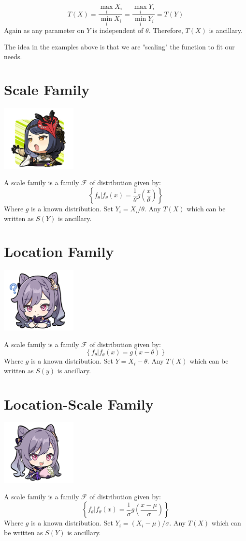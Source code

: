 \documentclass[oneside]{book}
\begin{document}
$$T(X)=\frac{\max_i X_i}{\min_i X_i}=\frac{\max_i Y_i}{\min_i Y_i}=T(Y)$$
Again as any parameter on $Y$ is independent of $\theta$. Therefore, $T(X)$ is ancillary. 

The idea in the examples above is that we are "scaling" the function to fit our needs. 
\section{Scale Family}
\begin{marginfigure}%
    \includegraphics[width=1.5in]{chibis/file_012.png}
\end{marginfigure}%
A scale family is a family $\mathcal F$ of distribution given by:
$$\left\{f_\theta|f_\theta(x)=\frac{1}{\theta}g\left(\frac{x}{\theta}\right)\right\}$$
Where $g$ is a known distribution. Set $Y_i=X_i/\theta$. Any $T(X)$ which can be written as $S(Y)$ is ancillary. 

\section{Location Family}
\begin{marginfigure}%
    \includegraphics[width=1.5in]{chibis/file_013.png}
\end{marginfigure}%
A scale family is a family $\mathcal F$ of distribution given by:
$$\left\{f_\theta|f_\theta(x)=g\left(x-\theta\right)\right\}$$
Where $g$ is a known distribution. Set $Y=X_i-\theta$. Any $T(X)$ which can be written as $S(y)$ is ancillary. 


\section{Location-Scale Family}
\begin{marginfigure}%
    \includegraphics[width=1.5in]{chibis/file_014.png}
\end{marginfigure}%
A scale family is a family $\mathcal F$ of distribution given by:
$$\left\{f_\theta|f_\theta(x)=\frac{1}{\sigma}g\left(\frac{x-\mu}{\sigma}\right)\right\}$$
Where $g$ is a known distribution. Set $Y_i=(X_i-\mu)/\sigma$. Any $T(X)$ which can be written as $S(Y)$ is ancillary. 
\end{document}
